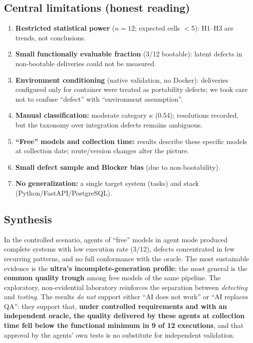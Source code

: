 \documentclass[11pt]{article}
\begin{document}
\subsection{Central limitations (honest reading)}\label{sec:limitations}

\begin{enumerate}
  \item \textbf{Restricted statistical power} ($n=12$; expected cells $<$5): H1--H3 are trends, not conclusions.
  \item \textbf{Small functionally evaluable fraction} (3/12 bootable): latent defects in non-bootable deliveries could not be measured.
  \item \textbf{Environment conditioning} (native validation, no Docker): deliveries configured only for container were treated as portability defects; we took care not to confuse ``defect'' with ``environment assumption''.
  \item \textbf{Manual classification:} moderate category $\kappa$ (0.54); resolutions recorded, but the taxonomy over integration defects remains ambiguous.
  \item \textbf{``Free'' models and collection time:} results describe these specific models at collection date; route/version changes alter the picture.
  \item \textbf{Small defect sample and Blocker bias} (due to non-bootability).
  \item \textbf{No generalization:} a single target system (tasks) and stack (Python/FastAPI/PostgreSQL).
\end{enumerate}

\subsection{Synthesis}

In the controlled scenario, agents of ``free'' models in agent mode produced complete systems with low execution rate (3/12), defects concentrated in few recurring patterns, and no full conformance with the oracle. The most sustainable evidence is the \textbf{ultra's incomplete-generation profile}; the most general is the \textbf{common quality trough} among free models of the same pipeline. The exploratory, non-evidential laboratory reinforces the separation between \emph{detecting} and \emph{testing}. The results \emph{do not} support either ``AI does not work'' or ``AI replaces QA'': they support that, \textbf{under controlled requirements and with an independent oracle, the quality delivered by these agents at collection time fell below the functional minimum in 9 of 12 executions}, and that approval by the agents' own tests is no substitute for independent validation.
\end{document}
